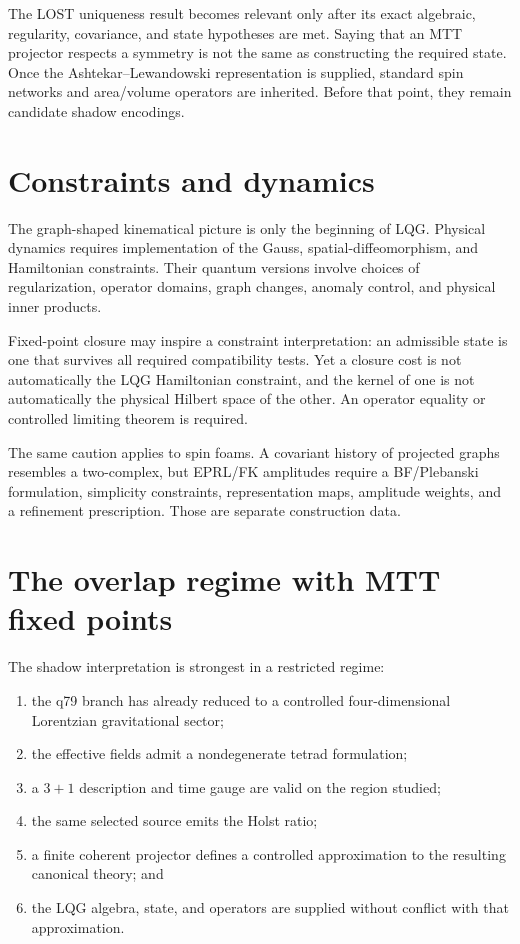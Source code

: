 \documentclass[11pt]{article}
\begin{document}
The LOST uniqueness result becomes relevant only after its exact algebraic,
regularity, covariance, and state hypotheses are met. Saying that an MTT
projector respects a symmetry is not the same as constructing the required
state. Once the Ashtekar--Lewandowski representation is supplied, standard
spin networks and area/volume operators are inherited. Before that point,
they remain candidate shadow encodings.

\section{Constraints and dynamics}

The graph-shaped kinematical picture is only the beginning of LQG. Physical
dynamics requires implementation of the Gauss, spatial-diffeomorphism, and
Hamiltonian constraints. Their quantum versions involve choices of
regularization, operator domains, graph changes, anomaly control, and
physical inner products.

Fixed-point closure may inspire a constraint interpretation: an admissible
state is one that survives all required compatibility tests. Yet a closure
cost is not automatically the LQG Hamiltonian constraint, and the kernel of
one is not automatically the physical Hilbert space of the other. An
operator equality or controlled limiting theorem is required.

The same caution applies to spin foams. A covariant history of projected
graphs resembles a two-complex, but EPRL/FK amplitudes require a BF/Plebanski
formulation, simplicity constraints, representation maps, amplitude weights,
and a refinement prescription. Those are separate construction data.

\section{The overlap regime with MTT fixed points}

The shadow interpretation is strongest in a restricted regime:
\begin{enumerate}
\item the q79 branch has already reduced to a controlled
  four-dimensional Lorentzian gravitational sector;
\item the effective fields admit a nondegenerate tetrad formulation;
\item a \(3+1\) description and time gauge are valid on the region studied;
\item the same selected source emits the Holst ratio;
\item a finite coherent projector defines a controlled approximation to the
  resulting canonical theory; and
\item the LQG algebra, state, and operators are supplied without conflict
  with that approximation.
\end{enumerate}
\end{document}
